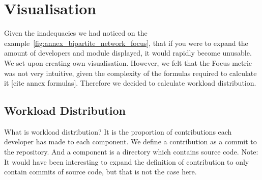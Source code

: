 \section{Visualisation}

Given the inadequacies we had noticed on the example~\ref{fig:annex_bipartite_network_focus}, that if you were to expand the amount of developers and module displayed, it would rapidly become unusable. We set upon creating own visualisation.
However, we felt that the Focus metric was not very intuitive, given the complexity of the formulas required to calculate it [cite annex formulas]. Therefore we decided to calculate workload distribution.

\subsection{Workload Distribution}

What is workload distribution?
It is the proportion of contributions each developer has made to each component.
We define a contribution as a commit to the repository.
And a component is a directory which contains source code.
Note: It would have been interesting to expand the definition of contribution to only contain commits of source code, but that is not the case here.\\

